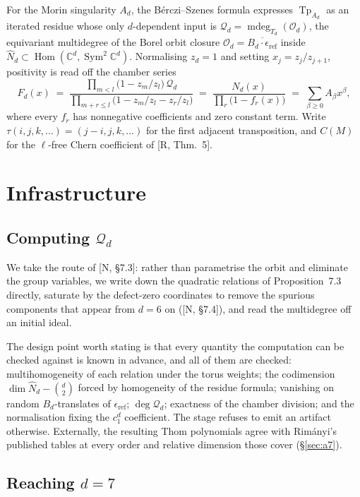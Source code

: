 \documentclass[11pt,a4paper]{article}
\DeclareMathOperator{\Tp}{Tp}
\DeclareMathOperator{\mdeg}{mdeg}
\DeclareMathOperator{\Hom}{Hom}
\DeclareMathOperator{\Sym}{Sym}
\newcommand{\Qd}{\mathcal{Q}}
\newcommand{\Nhat}{\widehat{N}}
\newcommand{\eref}{\epsilon_{\mathrm{ref}}}
\theoremstyle{plain}
\theoremstyle{definition}
\theoremstyle{remark}
\begin{document}
For the Morin singularity $A_d$, the B\'erczi--Szenes formula expresses $\Tp_{A_d}$ as an
iterated residue whose only $d$-dependent input is $\Qd_d = \mdeg_{T_d}(\mathcal{O}_d)$, the
equivariant multidegree of the Borel orbit closure $\mathcal{O}_d = \overline{B_d \cdot \eref}$
inside $\Nhat_d \subset \Hom(\mathbb{C}^d, \Sym^2 \mathbb{C}^d)$. Normalising $z_d = 1$ and
setting $x_j = z_j/z_{j+1}$, positivity is read off the chamber series
\[
  F_d(x) \;=\;
  \frac{\prod_{m<l}\bigl(1 - z_m/z_l\bigr)\,\Qd_d}
       {\prod_{m+r\le l}\bigl(1 - z_m/z_l - z_r/z_l\bigr)}
  \;=\; \frac{N_d(x)}{\prod_{r}\bigl(1 - f_r(x)\bigr)}
  \;=\; \sum_{\beta \ge 0} A_\beta x^\beta ,
\]
where every $f_r$ has nonnegative coefficients and zero constant term. Write
$\tau(i,j,k,\dots) = (j-i,j,k,\dots)$ for the first adjacent transposition, and $C(M)$ for the
$\ell$-free Chern coefficient of [R, Thm.~5].

\section{Infrastructure}

\subsection{Computing \texorpdfstring{$\Qd_d$}{Q\_d}}

We take the route of [N, \S7.3]: rather than parametrise the orbit and eliminate the group
variables, we write down the quadratic relations of Proposition~7.3 directly, saturate by the
defect-zero coordinates to remove the spurious components that appear from $d = 6$ on
([N, \S7.4]), and read the multidegree off an initial ideal.

The design point worth stating is that every quantity the computation can be checked against is
known in advance, and all of them are checked: multihomogeneity of each relation under the torus
weights; the codimension $\dim \Nhat_d - \binom{d}{2}$ forced by homogeneity of the residue
formula; vanishing on random $B_d$-translates of $\eref$; $\deg \Qd_d$; exactness of the chamber
division; and the normalisation fixing the $c_1^d$ coefficient. The stage refuses to emit an
artifact otherwise.  Externally, the resulting Thom polynomials agree with Rim\'anyi's published
tables at every order and relative dimension those cover (\S\ref{sec:a7}).

\subsection{Reaching \texorpdfstring{$d = 7$}{d = 7}}
\label{sec:scaling}
\end{document}
